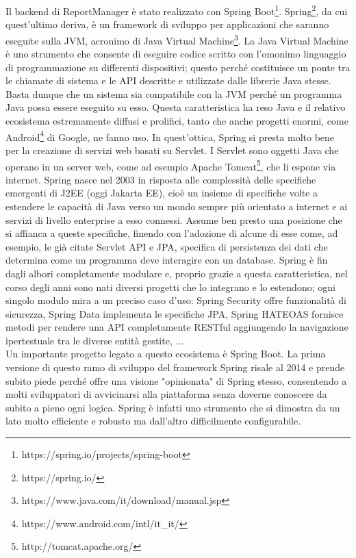 Il backend di ReportManager è stato realizzato con Spring Boot\footnote{https://spring.io/projects/spring-boot}.
Spring\footnote{https://spring.io/}, da cui quest'ultimo deriva, è un framework di sviluppo per applicazioni che saranno eseguite sulla JVM, 
acronimo di Java Virtual Machine\footnote{https://www.java.com/it/download/manual.jsp}.
La Java Virtual Machine è uno strumento che consente di eseguire codice scritto con l'omonimo linguaggio di programmazione su differenti dispositivi; questo perché costituisce 
un ponte tra le chiamate di sistema e le API descritte e utilizzate dalle librerie Java stesse.
Basta dunque che un sistema sia compatibile con la JVM perché un programma Java possa essere eseguito su esso.
Questa caratteristica ha reso Java e il relativo ecosistema estremamente diffusi e prolifici, tanto che anche progetti enormi, come Android\footnote{https://www.android.com/intl/it\_it/} 
di Google, ne fanno uso.
In quest'ottica, Spring si presta molto bene per la creazione di servizi web basati su Servlet.
I Servlet sono oggetti Java che operano in un server web, come ad esempio Apache Tomcat\footnote{http://tomcat.apache.org/}, che li espone via internet.
Spring nasce nel 2003 in risposta alle complessità delle specifiche emergenti di J2EE (oggi Jakarta EE), cioè un insieme di specifiche volte a estendere le capacità di Java 
verso un mondo sempre più orientato a internet e ai servizi di livello enterprise a esso connessi.
Assume ben presto una posizione che si affianca a queste specifiche, finendo con l'adozione di alcune di esse come, ad esempio, le già citate Servlet API e JPA, specifica di 
persistenza dei dati che determina come un programma deve interagire con un database.
Spring è fin dagli albori completamente modulare e, proprio grazie a questa caratteristica, nel corso degli anni sono nati diversi progetti che lo integrano e lo estendono;
ogni singolo modulo mira a un preciso caso d'uso: Spring Security offre funzionalità di sicurezza, Spring Data implementa le specifiche JPA, Spring HATEOAS fornisce metodi per 
rendere una API completamente RESTful aggiungendo la navigazione ipertestuale tra le diverse entità gestite, ...
\\
Un importante progetto legato a questo ecosistema è Spring Boot.
La prima versione di questo ramo di sviluppo del framework Spring risale al 2014 e prende subito piede perché offre una visione "opinionata" di Spring stesso, consentendo a molti
sviluppatori di avvicinarsi alla piattaforma senza doverne conoscere da subito a pieno ogni logica.
Spring è infatti uno strumento che si dimostra da un lato molto efficiente e robusto ma dall'altro difficilmente configurabile.
